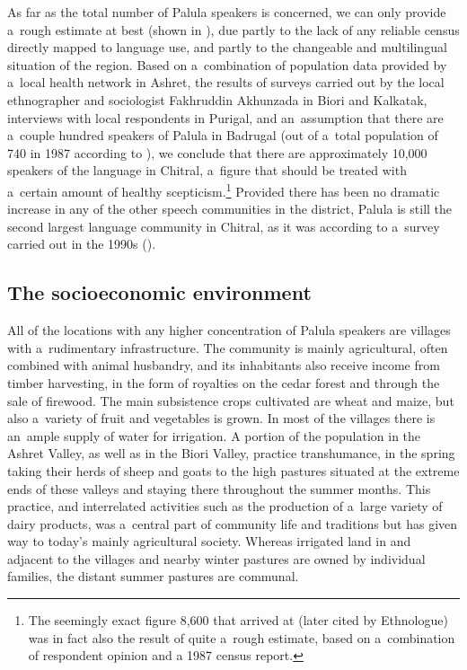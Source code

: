As far as the total number of Palula speakers is concerned, we can only provide a~rough estimate at
best (shown in ), due partly to the lack of any reliable census directly mapped
to language use, and partly to the changeable and multilingual situation of the region. Based on
a~combination of population data provided by a~local health network in Ashret, the results of
surveys carried out by the local ethnographer and sociologist Fakhruddin Akhunzada in Biori and Kalkatak,
interviews with local respondents in Purigal, and an~assumption that there are a~couple hundred
speakers of Palula in Badrugal (out of a~total population of 740 in 1987 according to
\citealt[143]{decker1992a}), we conclude that there are approximately 10,000 speakers of the
language in Chitral, a~figure that should be treated with a~certain amount of healthy
scepticism.\footnote{The seemingly exact figure 8,600 that \citep[74--76]{decker1992a} arrived at
  (later cited by Ethnologue) was in fact also the result of quite a~rough estimate, based on
  a~combination of respondent opinion and a 1987 census report.} Provided there has been no dramatic increase in any of the other speech communities in the district, Palula is still the second largest language community in Chitral, as it was according to a~survey carried out in the 1990s (\citealt[11]{decker1992a}). 

\subsection{The socioeconomic environment}
\label{subsec:1-2-2}

All of the locations with any higher concentration of Palula speakers are villages with a~rudimentary infrastructure. The community is mainly agricultural, often combined with animal husbandry, and its inhabitants also receive income from timber harvesting, in the form of royalties on the cedar forest and through the sale of firewood. The main subsistence crops cultivated are wheat and maize, but also a~variety of fruit and vegetables is grown. In most of the villages there is an~ample supply of water for irrigation. A portion of the population in the Ashret Valley, as well as in the Biori Valley, practice transhumance, in the spring taking their herds of sheep and goats to the high pastures situated at the extreme ends of these valleys and staying there throughout the summer months. This practice, and interrelated activities such as the production of a~large variety of dairy products, was a~central part of community life and traditions but has given way to today's mainly agricultural society. Whereas irrigated land in and adjacent to the villages and nearby winter pastures are owned by individual families, the distant summer pastures are communal.


